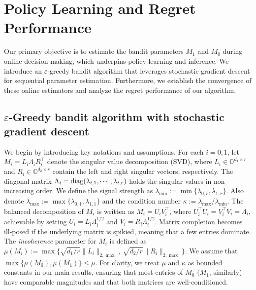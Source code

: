 \documentclass[12pt]{article}
\def\OO{{\mathbb O}}
\theoremstyle{plain}
\begin{document}
 
\section{Policy Learning and Regret Performance}\label{sec:policy-learning}
Our primary objective is to estimate the bandit parameters $M_1$ and $M_0$ during online decision-making, which underpins policy learning and inference. We introduce an $\varepsilon$-greedy bandit algorithm that leverages stochastic gradient descent for sequential parameter estimation. Furthermore, we establish the convergence of these online estimators and analyze the regret performance of our algorithm.

\subsection{\texorpdfstring{$\varepsilon$}{epsilon}-Greedy bandit algorithm with stochastic gradient descent}\label{sec:grad-desc}
We begin by introducing key notations and assumptions.  For each $i=0,1$, let $M_i=L_i\Lambda_i R_i^{\top}$ denote the singular value decomposition (SVD), where $L_i\in\OO^{d_1\times r}$ and $R_i\in\OO^{d_2\times r}$ contain the left and right singular vectors, respectively. The diagonal matrix $\Lambda_i={\rm diag}(\lambda_{i,1},\cdots,\lambda_{i,r})$ holds the singular values in non-increasing order. We define the signal strength as $\lambda_{\min}:=\min\{\lambda_{0,r}, \lambda_{1,r}\}$. Also denote $\lambda_{\max}:=\max\{\lambda_{0,1}, \lambda_{1,1}\}$ and the condition number $\kappa:=\lambda_{\max}/\lambda_{\min}$.  
The balanced decomposition of $M_i$ is written as $M_i=U_iV_i^{\top}$, where $U_i^{\top}U_i=V_i^{\top}V_i=\Lambda_i$, achievable by setting $U_i=L_i\Lambda_i^{1/2}$ and $V_i=R_i\Lambda_i^{1/2}$.  Matrix completion becomes ill-posed if the underlying matrix is spikied, meaning that a few entries dominate. The \emph{incoherence} parameter \citep{candes2012exact} for $M_i$ is defined as
$
\mu(M_i):=\max\big\{\sqrt{d_1/r}\|L_i\|_{2,\max},\ \sqrt{d_2/r}\|R_i\|_{2,\max} \big\}.
$
We assume that $\max\{\mu(M_0), \mu(M_1)\}\leq \mu$.  For clarity, we treat $\mu$ and $\kappa$ as bounded constants in our main results, ensuring that most entries of $M_0$ ($M_1$, similarly) have comparable magnitudes and that both matrices are well-conditioned. 
\end{document}
